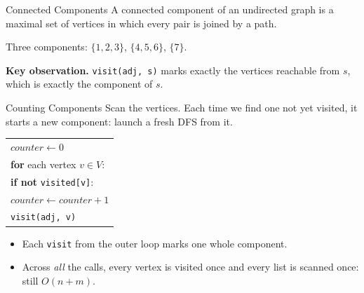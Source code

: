 \documentclass[10pt,aspectratio=169]{beamer}
\begin{document}
\begin{frame}{Connected Components}
  A \alert{connected component} of an undirected graph is a maximal set of
  vertices in which every pair is joined by a path.

  \bigskip
  \begin{center}
  \end{center}

  \bigskip
  \begin{center}
    Three components: $\{1,2,3\}$, $\{4,5,6\}$, $\{7\}$.
  \end{center}

  \pause
  \bigskip
  \textbf{Key observation.} \texttt{visit(adj, s)} marks exactly the vertices
  reachable from $s$, which is exactly \alert{the component of $s$}.
\end{frame}

\begin{frame}{Counting Components}
  Scan the vertices. Each time we find one not yet visited, it starts a new
  component: launch a fresh DFS from it.

  \bigskip
  \begin{center}
  \begin{tabular}{l}
    $\textit{counter} \gets 0$ \\
    \textbf{for} each vertex $v \in V$: \\
    \quad \textbf{if not} \texttt{visited[v]}: \\
    \quad\quad $\textit{counter} \gets \textit{counter} + 1$ \\
    \quad\quad \texttt{visit(adj, v)}
  \end{tabular}
  \end{center}

  \bigskip
  \pause
  \begin{itemize}
    \item Each \texttt{visit} from the outer loop marks one whole component.
    \item Across \emph{all} the calls, every vertex is visited once and every
          list is scanned once: still $O(n + m)$.
  \end{itemize}
\end{frame}
\end{document}
